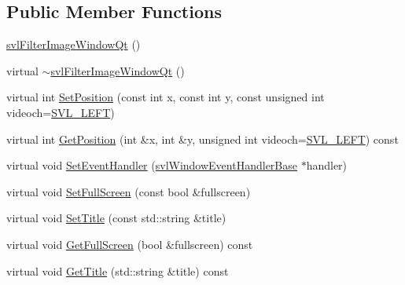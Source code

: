 \subsection*{Public Member Functions}
\begin{DoxyCompactItemize}
\item 
\hyperlink{classsvl_filter_image_window_qt_a069e1412de0bbf0c3eca6073b44ffba7}{svl\-Filter\-Image\-Window\-Qt} ()
\item 
virtual \hyperlink{classsvl_filter_image_window_qt_a47d81433ea3a2914d8c4b4391804bc96}{$\sim$svl\-Filter\-Image\-Window\-Qt} ()
\item 
virtual int \hyperlink{classsvl_filter_image_window_qt_aceef81c3d0aa4a60d74f8c2adada578c}{Set\-Position} (const int x, const int y, const unsigned int videoch=\hyperlink{svl_definitions_8h_ab9fec7615f19c8df2919eebcab0b187f}{S\-V\-L\-\_\-\-L\-E\-F\-T})
\item 
virtual int \hyperlink{classsvl_filter_image_window_qt_a0a213d43130ea046e79827c361265b73}{Get\-Position} (int \&x, int \&y, unsigned int videoch=\hyperlink{svl_definitions_8h_ab9fec7615f19c8df2919eebcab0b187f}{S\-V\-L\-\_\-\-L\-E\-F\-T}) const 
\item 
virtual void \hyperlink{classsvl_filter_image_window_qt_ac84cea44f3b44300b847e3d0bc0c2b61}{Set\-Event\-Handler} (\hyperlink{classsvl_window_event_handler_base}{svl\-Window\-Event\-Handler\-Base} $\ast$handler)
\item 
virtual void \hyperlink{classsvl_filter_image_window_qt_aca21e3caa482db351cbbbca30db8d462}{Set\-Full\-Screen} (const bool \&fullscreen)
\item 
virtual void \hyperlink{classsvl_filter_image_window_qt_aeb13a1dd3c075aa238ddd7208c0e6977}{Set\-Title} (const std\-::string \&title)
\item 
virtual void \hyperlink{classsvl_filter_image_window_qt_a74ae46705a4c9a624daa6db879199fb4}{Get\-Full\-Screen} (bool \&fullscreen) const 
\item 
virtual void \hyperlink{classsvl_filter_image_window_qt_aba1adaf57009c70684dfd0e1a63baabf}{Get\-Title} (std\-::string \&title) const 
\end{DoxyCompactItemize}
